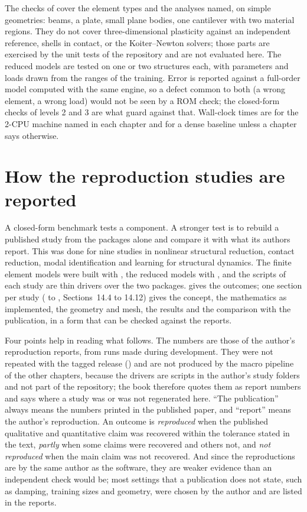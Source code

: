 The checks of  cover the element types and the analyses named, on simple geometries: beams, a plate, small plane bodies, one cantilever with two material regions. They do not cover three-dimensional plasticity against an independent reference, shells in contact, or the Koiter--Newton solvers; those parts are exercised by the unit tests of the repository and are not evaluated here. The reduced models are tested on one or two structures each, with parameters and loads drawn from the ranges of the training. Error is reported against a full-order model computed with the same engine, so a defect common to both (a wrong element, a wrong load) would not be seen by a ROM check; the closed-form checks of levels 2 and 3 are what guard against that. Wall-clock times are for the 2-CPU machine named in each chapter and for a dense baseline unless a chapter says otherwise.

\section{How the reproduction studies are reported}\label{sec:vf-repro}

A closed-form benchmark tests a component. A stronger test is to rebuild a published study from the packages alone and compare it with what its authors report. This was done for nine studies in nonlinear structural reduction, contact reduction, modal identification and learning for structural dynamics. The finite element models were built with \fea{}, the reduced models with \rom{}, and the scripts of each study are thin drivers over the two packages.  gives the outcomes; one section per study ( to , Sections~14.4 to 14.12) gives the concept, the mathematics as implemented, the geometry and mesh, the results and the comparison with the publication, in a form that can be checked against the reports.

Four points help in reading what follows. The numbers are those of the author's reproduction reports, from runs made during development. They were not repeated with the tagged release (\booktag{}) and are not produced by the macro pipeline of the other chapters, because the drivers are scripts in the author's study folders and not part of the repository; the book therefore quotes them as report numbers and says where a study was or was not regenerated here. ``The publication'' always means the numbers printed in the published paper, and ``report'' means the author's reproduction. An outcome is \emph{reproduced} when the published qualitative and quantitative claim was recovered within the tolerance stated in the text, \emph{partly} when some claims were recovered and others not, and \emph{not reproduced} when the main claim was not recovered. And since the reproductions are by the same author as the software, they are weaker evidence than an independent check would be; most settings that a publication does not state, such as damping, training sizes and geometry, were chosen by the author and are listed in the reports.

